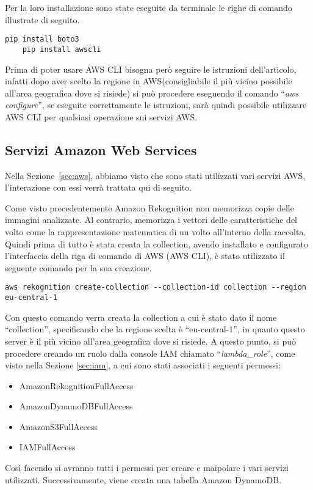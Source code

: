 Per la loro installazione sono state eseguite da terminale le righe di comando illustrate di seguito.
\begin{lstlisting}[frame=lines]
    pip install boto3
    pip install awscli
\end{lstlisting} 
Prima di poter usare AWS CLI bisogna però seguire le istruzioni dell'articolo\cite{cli}, infatti dopo aver scelto la regione in AWS(consigliabile il più vicino 
possibile all'area geografica dove si risiede) si può procedere eseguendo il comando ``\textit{aws configure}'', se eseguite correttamente le istruzioni, sarà quindi
possibile utilizzare AWS CLI per qualsiasi operazione sui servizi AWS.

\subsection{Servizi Amazon Web Services}
Nella Sezione~\ref{sec:aws}, abbiamo visto che sono stati utilizzati vari servizi AWS, l'interazione con essi verrà trattata qui di seguito.

Come visto precedentemente Amazon Rekognition non memorizza copie delle immagini analizzate. Al contrario, memorizza i vettori delle caratteristiche del volto come la
rappresentazione matematica di un volto all'interno della raccolta. 
Quindi prima di tutto è stata creata la collection, avendo installato e configurato l'interfaccia della riga di comando di AWS (AWS CLI), è stato utilizzato il 
seguente comando per la sua creazione.
\begin{lstlisting}[frame=lines]
    aws rekognition create-collection --collection-id collection --region eu-central-1 
\end{lstlisting}
Con questo comando verra creata la collection a cui è stato dato il nome ``collection'', specificando che la regione scelta è ``eu-central-1'', in quanto questo server 
è il più vicino all'area geografica dove si risiede. 
A questo punto, si può procedere creando un ruolo dalla console IAM chiamato ``\textsl{lambda\_role}'', come visto nella Sezione \ref{sec:iam}, a cui sono stati associati 
i seguenti permessi:
\begin{itemize}
    \item AmazonRekognitionFullAccess
    \item AmazonDynamoDBFullAccess
    \item AmazonS3FullAccess
    \item IAMFullAccess
\end{itemize}
Così facendo si avranno tutti i permessi per creare e maipolare i vari servizi utilizzati.
Successivamente, viene creata una tabella Amazon DynamoDB. 

